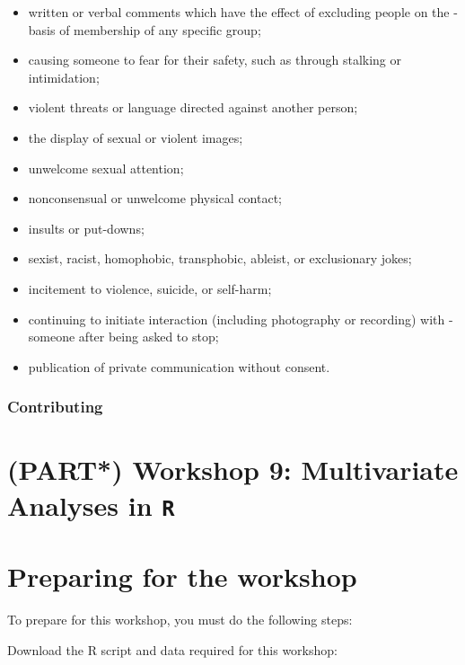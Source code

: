 \documentclass[
]{book}
\providecommand{\tightlist}{%
  \setlength{\itemsep}{0pt}\setlength{\parskip}{0pt}}
\begin{document}
\begin{itemize}
\tightlist
\item
  written or verbal comments which have the effect of excluding people on the - basis of membership of any specific group;
\item
  causing someone to fear for their safety, such as through stalking or intimidation;
\item
  violent threats or language directed against another person;
\item
  the display of sexual or violent images;
\item
  unwelcome sexual attention;
\item
  nonconsensual or unwelcome physical contact;
\item
  insults or put-downs;
\item
  sexist, racist, homophobic, transphobic, ableist, or exclusionary jokes;
\item
  incitement to violence, suicide, or self-harm;
\item
  continuing to initiate interaction (including photography or recording) with - someone after being asked to stop;
\item
  publication of private communication without consent.
\end{itemize}

\hypertarget{contributing}{%
\subsection{Contributing}\label{contributing}}

\hypertarget{part-workshop-9-multivariate-analyses-in-r}{%
\chapter*{\texorpdfstring{(PART*) Workshop 9: Multivariate Analyses in \texttt{R}}{(PART*) Workshop 9: Multivariate Analyses in R}}\label{part-workshop-9-multivariate-analyses-in-r}}

\hypertarget{preparing-for-the-workshop}{%
\chapter{Preparing for the workshop}\label{preparing-for-the-workshop}}

To prepare for this workshop, you must do the following steps:

Download the R script and data required for this workshop:
\end{document}
